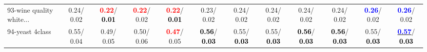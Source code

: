 \begin{table}[h]
\begin{center}
{\begin{tabular}{lc|c|c|c|c|c|c|c|c|c|c}
93-wine quality white... &   0.24/  0.02 & \textcolor{red}{\textbf{  0.22}}/\textcolor{black}{\textbf{  0.01}} & \textcolor{red}{\textbf{  0.22}}/  0.02 & \textcolor{red}{\textbf{  0.22}}/\textcolor{black}{\textbf{  0.01}} &   0.23/  0.02 &   0.24/  0.02 &   0.24/  0.02 &   0.24/  0.02 &   0.24/  0.02 & \textcolor{blue}{\textbf{  0.26}}/  0.02 & \textcolor{blue}{\textbf{  0.26}}/  0.02 \\
94-yeast 4class &   0.55/  0.04 &   0.49/  0.05 &   0.50/  0.06 & \textcolor{red}{\textbf{  0.47}}/  0.05 & \textcolor{black}{\textbf{  0.56}}/\textcolor{black}{\textbf{  0.03}} &   0.55/\textcolor{black}{\textbf{  0.03}} &   0.55/\textcolor{black}{\textbf{  0.03}} & \textcolor{black}{\textbf{  0.56}}/\textcolor{black}{\textbf{  0.03}} & \textcolor{black}{\textbf{  0.56}}/\textcolor{black}{\textbf{  0.03}} &   0.55/\textcolor{black}{\textbf{  0.03}} & \underline{\textcolor{blue}{\textbf{  0.57}}}/\textcolor{black}{\textbf{  0.03}} \\\end{tabular}
}\label{strats2bSVM}
\end{center}
\end{table}
                                     